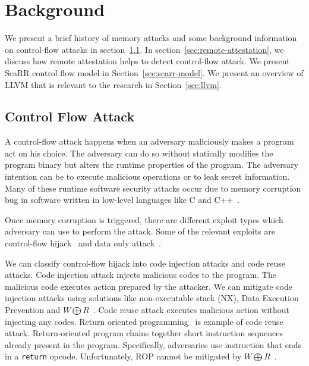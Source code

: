 
\chapter{Background} %

\label{Chapter3} %

We present a brief history of memory attacks and some background information on
control-flow attacks in section~\ref{sec:control-flow-attack}. In
section~\ref{sec:remote-attestation}, we discuss how remote attestation helps to
detect control-flow attack. We present ScaRR control flow model in
Section~\ref{sec:scarr-model}. We present an overview of LLVM that is relevant
to the research in Section~\ref{sec:llvm}.

\section{Control Flow Attack}
\label{sec:control-flow-attack}

A control-flow attack happens when an adversary maliciously makes a program act
on his choice. The adversary can do so without statically modifies the program
binary but alters the runtime properties of the program. The adversary intention
can be to execute malicious operations or to leak secret information. Many of
these runtime software security attacks occur due to memory corruption bug
in software written in low-level languages like C and
C++~\cite{szekeresSoKEternalWar2013}.

Once memory corruption is triggered, there are different exploit types which
adversary can use to perform the attack. Some of the relevant exploits are
control-flow hijack~\cite{shachamGeometryInnocentFlesh2007,
schusterCounterfeitObjectorientedProgramming2015}  and data only
attack~\cite{chenNonControlDataAttacksAre2005,
carliniControlFlowBendingEffectiveness2015}. 

We can classify control-flow hijack into code injection attacks and code reuse
attacks. Code injection attack injects malicious codes to the program. The
malicious code executes action prepared by the attacker. We can mitigate code
injection attacks using solutions like non-executable stack (NX), Data Execution
Prevention and \( W \bigoplus R \)~\cite{vanderveenMemoryErrorsPresent2012}.
Code reuse attack executes malicious action without injecting any codes. Return
oriented programming~\cite{roemerReturnorientedProgrammingSystems2012} is
example of code reuse attack. Return-oriented program chains together short
instruction sequences already present in the program. Specifically, adversaries
use instruction that ends in a \texttt{return} opcode. Unfortunately, ROP cannot
be mitigated by \( W \bigoplus R
\)~\cite{roemerReturnorientedProgrammingSystems2012}.

